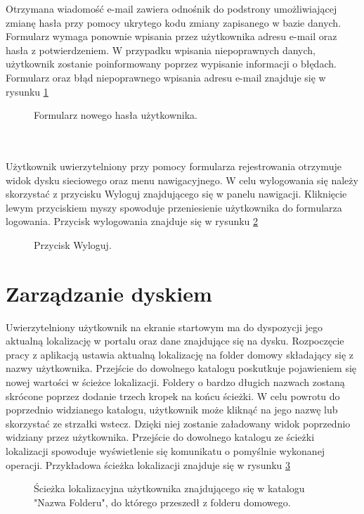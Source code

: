 Otrzymana wiadomość e-mail zawiera odnośnik do podstrony umożliwiającej zmianę hasła przy pomocy ukrytego kodu zmiany zapisanego w bazie danych. Formularz wymaga ponownie wpisania przez użytkownika adresu e-mail oraz hasła z potwierdzeniem. W przypadku wpisania niepoprawnych danych, użytkownik zostanie poinformowany poprzez wypisanie informacji o błędach. Formularz oraz błąd niepoprawnego wpisania adresu e-mail znajduje się w rysunku \ref{fig:9}
\begin{figure}[!h]
	\centering
	\caption{Formularz nowego hasła użytkownika.}
	\label{fig:9}
\end{figure}
\\
\\
Użytkownik uwierzytelniony przy pomocy formularza rejestrowania otrzymuje widok dysku sieciowego oraz menu nawigacyjnego. W celu wylogowania się należy skorzystać z przycisku Wyloguj znajdującego się w panelu nawigacji. Kliknięcie lewym przyciskiem myszy spowoduje przeniesienie użytkownika do formularza logowania. Przycisk wylogowania znajduje się w rysunku \ref{fig:10}
\begin{figure}[!h]
	\centering
	\caption{Przycisk Wyloguj.}
	\label{fig:10}
\end{figure}
\newpage
\section{Zarządzanie dyskiem}

Uwierzytelniony użytkownik na ekranie startowym ma do dyspozycji jego aktualną lokalizację w portalu oraz dane znajdujące się na dysku. Rozpoczęcie pracy z aplikacją ustawia aktualną lokalizację na folder domowy składający się z nazwy użytkownika. Przejście do dowolnego katalogu poskutkuje pojawieniem się nowej wartości w ścieżce lokalizacji. Foldery o bardzo długich nazwach zostaną skrócone poprzez dodanie trzech kropek na końcu ścieżki.  W celu powrotu do poprzednio widzianego katalogu, użytkownik może kliknąć na jego nazwę lub skorzystać ze strzałki wstecz. Dzięki niej zostanie załadowany widok poprzednio widziany przez użytkownika. Przejście do dowolnego katalogu ze ścieżki lokalizacji spowoduje wyświetlenie się komunikatu o pomyślnie wykonanej operacji. Przykładowa ścieżka lokalizacji znajduje się w rysunku \ref{fig:11}
\begin{figure}[!h]
	\centering
	\caption{Ścieżka lokalizacyjna użytkownika znajdującego się w katalogu "Nazwa Folderu", do którego przeszedł z folderu domowego. }
	\label{fig:11}
\end{figure}

